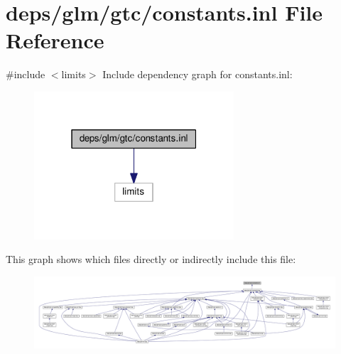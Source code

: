 \hypertarget{constants_8inl}{}\section{deps/glm/gtc/constants.inl File Reference}
\label{constants_8inl}
{\ttfamily \#include $<$limits$>$}\newline
Include dependency graph for constants.\+inl\+:
\nopagebreak
\begin{figure}[H]
\begin{center}
\leavevmode
\includegraphics[width=211pt]{df/d1e/constants_8inl__incl}
\end{center}
\end{figure}
This graph shows which files directly or indirectly include this file\+:
\nopagebreak
\begin{figure}[H]
\begin{center}
\leavevmode
\includegraphics[width=350pt]{d4/df9/constants_8inl__dep__incl}
\end{center}
\end{figure}
